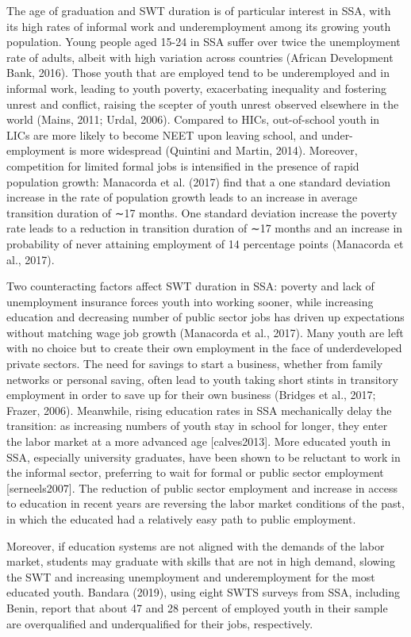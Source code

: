 \documentclass[
  11pt,
a4paper
]{article}
\begin{document}
The age of graduation and SWT duration is of particular interest in SSA, with its high rates of informal work and underemployment among its growing youth population. Young people aged 15-24 in SSA suffer over twice the unemployment rate of adults, albeit with high variation across countries (African Development Bank, 2016). Those youth that are employed tend to be underemployed and in informal work, leading to youth poverty, exacerbating inequality and fostering unrest and conflict, raising the scepter of youth unrest observed elsewhere in the world (Mains, 2011; Urdal, 2006). Compared to HICs, out-of-school youth in LICs are more likely to become NEET upon leaving school, and under-employment is more widespread (Quintini and Martin, 2014). Moreover, competition for limited formal jobs is intensified in the presence of rapid population growth: Manacorda et al. (2017) find that a one standard deviation increase in the rate of population growth leads to an increase in average transition duration of ∼17 months. One standard deviation increase the poverty rate leads to a reduction in transition duration of ∼17 months and an increase in probability of never attaining employment of 14 percentage points (Manacorda et al., 2017).

Two counteracting factors affect SWT duration in SSA: poverty and lack of unemployment insurance forces youth into working sooner, while increasing education and decreasing number of public sector jobs has driven up expectations without matching wage job growth (Manacorda et al., 2017). Many youth are left with no choice but to create their own employment in the face of underdeveloped private sectors. The need for savings to start a business, whether from family networks or personal saving, often lead to youth taking short stints in transitory employment in order to save up for their own business (Bridges et al., 2017; Frazer, 2006). Meanwhile, rising education rates in SSA mechanically delay the transition: as increasing numbers of youth stay in school for longer, they enter the labor market at a more advanced age {[}calves2013{]}. More educated youth in SSA, especially university graduates, have been shown to be reluctant to work in the informal sector, preferring to wait for formal or public sector employment {[}serneels2007{]}. The reduction of public sector employment and increase in access to education in recent years are reversing the labor market conditions of the past, in which the educated had a relatively easy path to public employment.

Moreover, if education systems are not aligned with the demands of the labor market, students may graduate with skills that are not in high demand, slowing the SWT and increasing unemployment and underemployment for the most educated youth. Bandara (2019), using eight SWTS surveys from SSA, including Benin, report that about 47 and 28 percent of employed youth in their sample are overqualified and underqualified for their jobs, respectively.
\end{document}

